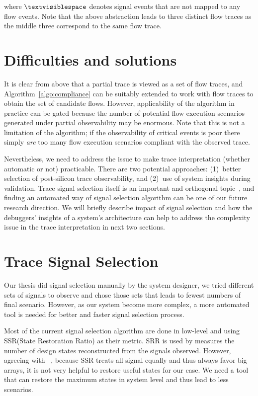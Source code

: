 \documentclass[12pt,frontmatter,copyright,thesis]{usfmanus}
\begin{document}
where $\textvisiblespace$ denotes signal events that are not
mapped to any flow events.  Note that the above abstraction
leads to three distinct flow traces as the middle three
correspond to the same flow trace.

\section{Difficulties and solutions}
It is clear from above that a partial trace is viewed as a
set of flow traces, and Algorithm~\ref{algo:compliance} can
be suitably extended to work with flow traces to obtain the
set of candidate flows.  However, applicability of the
algorithm in practice can be gated because the number of
potential flow execution scenarios generated under partial
observability may be enormous.  Note that this is not a
limitation of the algorithm; if the observability of
critical events is poor there simply {\em are} too many flow
execution scenarios compliant with the observed trace.

Nevertheless, we need to address the issue to make trace
interpretation (whether automatic or not) practicable.
There are two potential approaches: (1)~better selection of
post-silicon trace observability, and (2)~use of system
insights during validation. 
Trace signal selection itself
is an important and orthogonal topic~\cite{nicolici,basu},
and finding an automated way of signal selection algorithm can be one 
of our future research direction. We will briefly describe impact of signal selection
and how the debuggers'
insights of a system's architecture can help to address the
complexity issue in the trace interpretation in next two sections.

\section{Trace Signal Selection}
Our thesis did signal selection manually by the system designer,
we tried different sets of signals to observe and chose those sets that leads to fewest
numbers of final scenario.  However, as our system become more complex,
 a more automated tool is needed for better and faster signal selection process.
 
Most of the current signal selection algorithm are done in low-level and using 
SSR(State Restoration Ratio)  as 
their metric. 
SRR is used by measures the number of design states reconstructed
 from the signals observed. 
However, agreeing with 
 ~\cite{forestMa}, because SSR treats all signal equally and thus always favor big arrays,
 it is not very helpful to restore useful states for our case. We need a tool that can 
 restore the maximum states in system level and thus lead to less scenarios.
 
\end{document}
